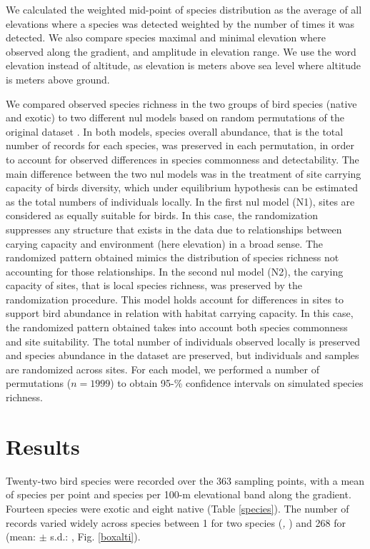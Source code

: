 \documentclass{article}
\begin{document}
We calculated the weighted mid-point of species distribution as the average of all elevations where a species was detected weighted by the number of times it was detected. We also compare species maximal and minimal elevation where observed along the gradient, and amplitude in elevation range. We use the word elevation instead of altitude, as elevation is meters above sea level where altitude is meters above ground.

We compared observed species richness in the two groups of bird species (native and exotic) to two different nul models based on random permutations of the original dataset  \cite{Gotelli2000}. In both models, species overall abundance, that is the total number of records for each species, was preserved in each permutation, in order to account for observed differences in species commonness and detectability. The main difference between the two nul models was in the treatment of site carrying capacity of birds diversity, which under equilibrium hypothesis can be estimated as the total numbers of individuals locally. In the first nul model (N1), sites are considered as equally suitable for birds. In this case, the randomization suppresses any structure that exists in the data due to relationships between carying capacity and environment (here elevation) in a broad sense. The randomized pattern obtained mimics the distribution of species richness not accounting for those relationships. In the second nul model (N2), the carying capacity of sites, that is local species richness, was preserved by the randomization procedure. This model holds account for differences in sites to support bird abundance in relation with habitat carrying capacity. In this case, the randomized pattern obtained takes into account both species commonness and site suitability. The total number of individuals observed locally is preserved and species abundance in the dataset are preserved, but individuals and samples are randomized across sites. For each model, we performed a number of permutations ($n=1999$) to obtain 95-\% confidence intervals on simulated species richness. 


\section{Results}

Twenty-two bird species were recorded over the 363 sampling points, with a mean of  species per point and  species per 100-m elevational band along the gradient.  Fourteen species were exotic and eight native (Table \ref{species}). The number of records varied widely across species between 1 for two species (\textit{, }) and 268 for \textit{} (mean:  $\pm$ s.d.: , Fig. \ref{boxalti}). 
\end{document}
